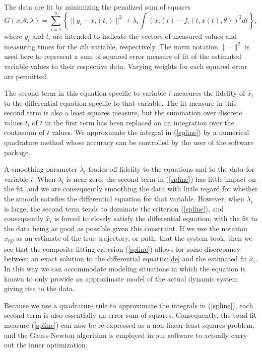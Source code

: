 \documentclass{article}
\begin{document}
The data are fit by minimizing the penalized sum of squares
\begin{equation} \label{spline}
 G(x,\theta,\lambda) = \sum_{i=1}^n \left\{ \|y_i - x_i(t_i)\|^2 +
       \lambda_i \int \left( \dot{x}_i(t) - f_i(t,x(t),\theta) \right)^2 dt \right\},
\end{equation}
where $y_i$ and $t_i$ are intended to indicate the vectors of measured values and measuring times
for the $i$th variable, respectively. The norm notation $\| \cdot \|^2$ is used here to represent a
sum of squared error measure of fit of the estimated variable values to their respective data.
Varying weights for each squared error are permitted.

The second term in this equation specific to variable $i$ measures the fidelity of $\hat{x}_i$ to
the differential equation specific to that variable. The fit measure in this second term is also a
least squares measure, but the summation over discrete values $t_i$ of $t$ in the first term has
been replaced an an integration over the continuum of $t$ values. We approximate the integral in
(\ref{spline}) by a numerical quadrature method whose accuracy can be controlled by the user of the
software package.

A smoothing parameter $\lambda_i$ trades-off fidelity to the equations and to the data for variable
$i$. When $\lambda_i$ is near zero, the second term in (\ref{spline}) has little impact on the fit,
and we are consequently smoothing the data with little regard for whether the smooth satisfies the
differential equation for that variable.  However, when $\lambda_i$ is large, the second term tends
to dominate the criterion (\ref{spline}), and consequently $\hat{x}_i$ is forced to closely satisfy
the differential equation, with the fit to the data being as good as possible given this
constraint. If we use the notation $x_{t|\theta}$ as an estimate of the true trajectory, or path,
that the system took, then we see that the composite fitting criterion (\ref{spline}) allows for
some discrepancy between an exact solution to the differential equation\ref{de} and the estimated
fit $\hat{x}_i$. In this way we can accommodate modeling situations in which the equation is known
to only provide an approximate model of the actual dynamic system giving rise to the data.

Because we use a quadrature rule to approximate the integrals in (\ref{spline}), each second term
is also essentially an error sum of squares. Consequently, the total fit measure (\ref{spline}) can
now be re-expressed as a non-linear least-squares problem, and the Gauss-Newton algorithm is
employed in our software to actually carry out the inner optimization.
\end{document}
